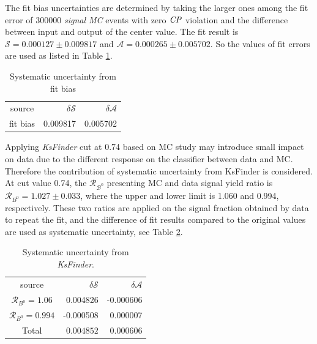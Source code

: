 The fit bias uncertainties are determined by taking the larger ones among the fit error of 300000 \textit{signal MC}  events  with zero $\it{CP}$ violation and the difference between input and output of the center value. The fit result is $\mathcal{S} = 0.000127\pm0.009817$ and $\mathcal{A} = 0.000265\pm0.005702$. So the values of fit errors are used as listed in Table \ref{tab:fitbias}.
\begin{table}[htpb]
	\begin{minipage}[b]{1.0\linewidth}
		\centering
		\caption{Systematic uncertainty from fit bias}
		\label{tab:fitbias}
		\begin{tabular}{c r r}
			\hline
			source & $\delta \mathcal{S}$ & $\delta \mathcal{A}$ \\
			fit bias & 0.009817 & 0.005702\\
			\hline
		\end{tabular}
	\end{minipage}
\end{table}

Applying \textit{KsFinder} cut at 0.74 based on MC study may introduce small impact on data due to the different response on the classifier between data and MC. Therefore the contribution of systematic uncertainty from KsFinder is considered. At cut value  0.74, the $\mathcal{R_{B^0}}$ presenting MC and data signal yield ratio is $\mathcal{R}_{B^0} = 1.027 \pm 0.033$, where the upper and lower limit is 1.060 and 0.994, respectively. These two ratios are applied on the signal fraction obtained by data to repeat the fit, and the difference of fit results compared to the original values are used as systematic uncertainty, see Table \ref{tab:sy_ks}.

\begin{table}[htpb]
	\begin{minipage}[b]{1.0\linewidth}
		\centering
		\caption{Systematic uncertainty from \textit{KsFinder}.}
		\label{tab:sy_ks}
		\begin{tabular}{c r r}
			\hline
			source & $\delta \mathcal{S}$ & $\delta \mathcal{A}$ \\
			$\mathcal{R}_{B^0}=1.06$ & 0.004826
 & -0.000606\\
			$\mathcal{R}_{B^0}=0.994$ & -0.000508
& 0.000007
\\
			\hline
			Total &
			{$0.004852$} &
			{$0.000606$}\\
			\hline
		\end{tabular}
	\end{minipage}
\end{table}

